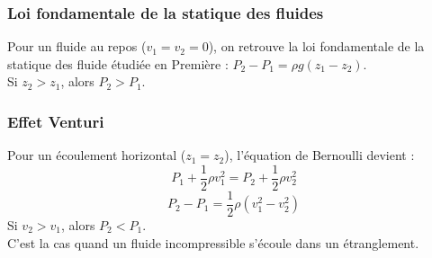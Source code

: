 \documentclass[a4paper,11pt,fleqn]{scrartcl}%
\begin{document}
        \subsubsection{Loi fondamentale de la statique des fluides}
        Pour un fluide au repos ($v_1 = v_2 = 0$), on retrouve la loi fondamentale de la statique des fluide étudiée en Première : $P_2 - P_1 = \rho g (z_1-z_2)$.\\
        Si $z_2>z_1$, alors $P_2>P_1$.

        \subsubsection{Effet Venturi}
        Pour un écoulement horizontal ($z_1=z_2$), l'équation de Bernoulli devient : $$P_1 + \frac{1}{2}\rho v_1^2 = P_2 + \frac{1}{2}\rho v_2^2$$
        $$P_2 - P_1 = \frac{1}{2}\rho (v_1^2-v_2^2)$$
        Si $v_2>v_1$, alors $P_2<P_1$.\\
        C'est la cas quand un fluide incompressible s'écoule dans un étranglement.
\end{document}

